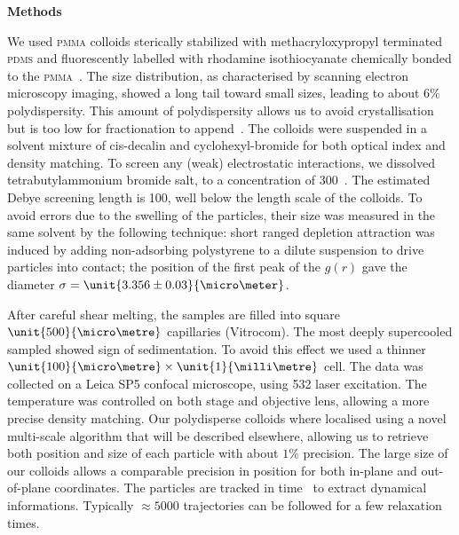 \vspace{1cm}
\noindent
{\bf Methods}

We used \textsc{pmma} colloids sterically stabilized with methacryloxypropyl terminated \textsc{pdms} and fluorescently labelled with rhodamine isothiocyanate chemically bonded to the \textsc{pmma}~\citep{bosma2002}. The size distribution, as characterised by scanning electron microscopy imaging, showed a long tail toward small sizes, leading to about $6\%$ polydispersity. This amount of polydispersity allows us to avoid crystallisation but is too low for fractionation to append~\citep{Fasolo2003}. The colloids were suspended in a solvent mixture of cis-decalin and cyclohexyl-bromide for both optical index and density matching. To screen any (weak) electrostatic interactions, we dissolved tetrabutylammonium bromide salt, to a concentration of \unit{300}{\nano\mole\per\liter}~\citep{royall2005}. The estimated Debye screening length is \unit{100}{\nano\metre}, well below the length scale of the colloids. To avoid errors due to the swelling of the particles, their size was measured in the same solvent by the following technique: short ranged depletion attraction was induced by adding non-adsorbing polystyrene to a dilute suspension to drive particles into contact; the position of the first peak of the $g(r)$ gave the diameter $\sigma = \unit{3.356\pm0.03}{\micro\meter}$.

After careful shear melting, the samples are filled into square $\unit{500}{\micro\metre}$ capillaries (Vitrocom). The most deeply supercooled sampled showed sign of sedimentation. To avoid this effect we used a thinner $\unit{100}{\micro\metre}\times\unit{1}{\milli\metre}$ cell. The data was collected on a Leica SP5 confocal microscope, using \unit{532}{\nano\meter} laser excitation. The temperature was controlled on both stage and objective lens, allowing a more precise density matching. Our polydisperse colloids where localised using a novel multi-scale algorithm that will be described elsewhere, allowing us to retrieve both position and size of each particle with about $1\%$ precision. The large size of our colloids allows a comparable precision in position for both in-plane and out-of-plane coordinates. The particles are tracked in time~\citep{Crocker1996} to extract dynamical informations. Typically $\approx 5000$ trajectories can be followed for a few relaxation times.



